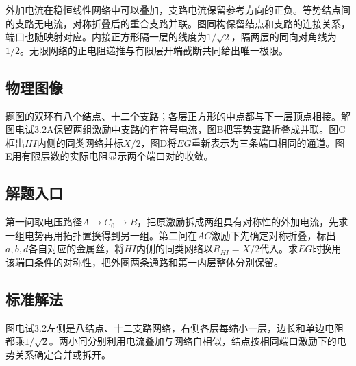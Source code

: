 \documentclass[UTF8,fontset=fandol,a4paper,11pt]{ctexart}
\begin{document}
外加电流在稳恒线性网络中可以叠加，支路电流保留参考方向的正负。等势结点间的支路无电流，对称折叠后的重合支路并联。图同构保留结点和支路的连接关系，端口也随映射对应。内接正方形隔一层的线度为$1/\sqrt2$，隔两层的同向对角线为$1/2$。无限网络的正电阻递推与有限层开端截断共同给出唯一极限。



\subsection*{物理图像}

题图的双环有八个结点、十二个支路；各层正方形的中点都与下一层顶点相接。解图电试3.2A保留两组激励中支路的有符号电流，图B把等势支路折叠成并联。图C框出$HI$内侧的同类网络并标$X/2$，图D将$EG$重新表示为三条端口相同的通道。图E用有限层数的实际电阻显示两个端口对的收敛。



\subsection*{解题入口}

第一问取电压路径$A\to C_0\to B$，把原激励拆成两组具有对称性的外加电流，先求一组电势再用拓扑置换得到另一组。第二问在$AC$激励下先确定对称折叠，标出$a,b,d$各自对应的金属丝，将$HI$内侧的同类网络以$R_{HI}=X/2$代入。求$EG$时换用该端口条件的对称性，把外圈两条通路和第一内层整体分别保留。



\subsection*{标准解法}


图电试3.2左侧是八结点、十二支路网络，右侧各层每缩小一层，边长和单边电阻都乘$1/\sqrt2$。两小问分别利用电流叠加与网络自相似，结点按相同端口激励下的电势关系确定合并或拆开。
\end{document}
